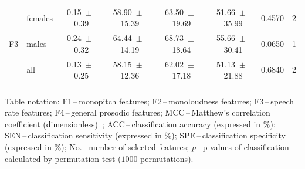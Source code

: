 \begin{table}[htb!]
\begin{threeparttable}
\begin{tabular}{c l c c c c c c}
			\multirow{3}{*}{F3} &
			  females & 0.15~$\pm$~0.39 & 58.90~$\pm$~15.39 & 63.50~$\pm$~19.69 & 51.66~$\pm$~35.99 & 0.4570 & 2 \\
			& males   & 0.24~$\pm$~0.32 & 64.44~$\pm$~14.19 & 68.73~$\pm$~18.64 & 55.66~$\pm$~30.41 & 0.0650 & 1 \\
			& all     & 0.13~$\pm$~0.25 & 58.15~$\pm$~12.36 & 62.02~$\pm$~17.18 & 51.13~$\pm$~21.88 & 0.6840 & 2 \\
			\noalign{\smallskip}
			
			\noalign{\smallskip}\hline\hline
		\end{tabular}
		
		\begin{tablenotes}
			\scriptsize
			\item Table notation: F1\,--\,monopitch features; F2\,--\,monoloudness features; F3\,--\,speech rate features; F4\,--\,general prosodic features; MCC\,--\,Matthew's correlation coefficient (dimensionless)~\cite{Matthews1975}; ACC\,--\,classification accuracy (expressed in $\%$); SEN\,--\,classification sensitivity (expressed in $\%$); SPE\,--\,classification specificity (expressed in $\%$); No.\,--\,number of selected features; $p$\,--\,p-values of classification calculated by permutation test ($1000$ permutations).
		\end{tablenotes}
	\end{threeparttable}
\end{table}

